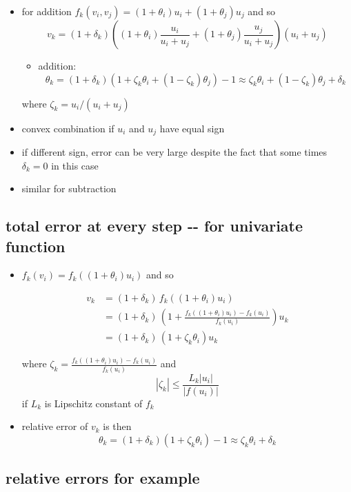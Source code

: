 \documentclass[11pt]{article}
\providecommand{\tightlist}{%
      \setlength{\itemsep}{0pt}\setlength{\parskip}{0pt}}
\begin{document}
\begin{itemize}
\item
  for addition \(f_k(v_i,v_j) = (1+\theta_i)u_i + (1+\theta_j)u_j\) and
  so
  \[v_k = (1+\delta_k)\left((1+\theta_i)\frac{u_i}{u_i+u_j} + (1+\theta_j)\frac{u_j}{u_i+u_j}\right)(u_i + u_j)\]

  \begin{itemize}
  \tightlist
  \item
    addition:
    \[\theta_k = (1+\delta_k)\left(1 + \zeta_k\theta_i + (1-\zeta_k)\theta_j\right)-1 \approx
      \zeta_k\theta_i + (1-\zeta_k)\theta_j + \delta_k\]
  \end{itemize}

  where \(\zeta_k = u_i/(u_i+u_j)\)
\item
  convex combination if \(u_i\) and \(u_j\) have equal sign
\item
  if different sign, error can be very large despite the fact that some
  times \(\delta_k = 0\) in this case
\item
  similar for subtraction
\end{itemize}

\subsection{total error at every step -\/- for univariate
function}\label{total-error-at-every-step----for-univariate-function}

\begin{itemize}
\item
  \(f_k(v_i) = f_k((1+\theta_i)u_i)\) and so

  \begin{align*} v_k &= (1+\delta_k)\, f_k((1+\theta_i)u_i) \\
                   &= (1+\delta_k)\, \left(1 + \frac{f_k((1+\theta_i)u_i) - f_k(u_i)}{f_k(u_i)}\right)u_k\\
                   &= (1+\delta_k)\, (1 + \zeta_k\theta_i) u_k
    \end{align*}

  where \(\zeta_k = \frac{f_k((1+\theta_i)u_i) - f_k(u_i)}{f_k(u_i)}\)
  and \[|\zeta_k| \leq \frac{L_k |u_i|}{|f(u_i)|}\] if \(L_k\) is
  Lipschitz constant of \(f_k\)
\item
  relative error of \(v_k\) is then
  \[\theta_k = (1+\delta_k)(1+\zeta_k \theta_i) - 1 \approx \zeta_k \theta_i + \delta_k\]
\end{itemize}

\subsection{relative errors for
example}\label{relative-errors-for-example}
\end{document}
